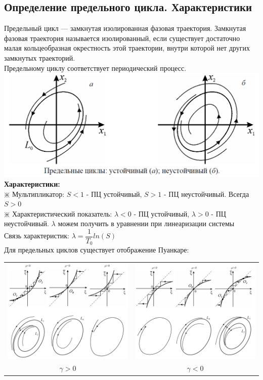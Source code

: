 \begin{multicols*}{2}
		\section{Определение предельного цикла. Характеристики}
		Предельный цикл — замкнутая изолированная фазовая траектория. Замкнутая фазовая траектория называется изолированный, если существует достаточно малая кольцеобразная окрестность этой траектории, внутри которой нет других замкнутых траекторий.\\
		Предельному циклу соответствует периодический процесс.\\
		\includegraphics[width=0.7\linewidth]{tk_img/predel.png}\\
		\textbf{Характеристики:}\\
		$\divideontimes$ Мультипликатор: $S<1$ - ПЦ устойчивый, $S>1$ - ПЦ неустойчивый. Всегда $S>0$\\
		$\divideontimes$ Характеристический показатель: $\lambda<0$ - ПЦ устойчивый, $\lambda>0$ - ПЦ неустойчивый. $\lambda$ можем получить в уравнении при линеаризации системы\\
		Связь характеристик: $\lambda = \dfrac{1}{T_0}ln(S)$ \\
		Для предельных циклов существует отображение Пуанкаре: \\
		\begin{tabular}{c | c}
			{\includegraphics[width=0.45\linewidth]{tk_img/predel_1.png}} & {\includegraphics[width=0.45\linewidth]{tk_img/predel_2.png}} \\
			{$\gamma > 0$} & {$\gamma < 0$}
		\end{tabular}
		

\end{multicols*}
